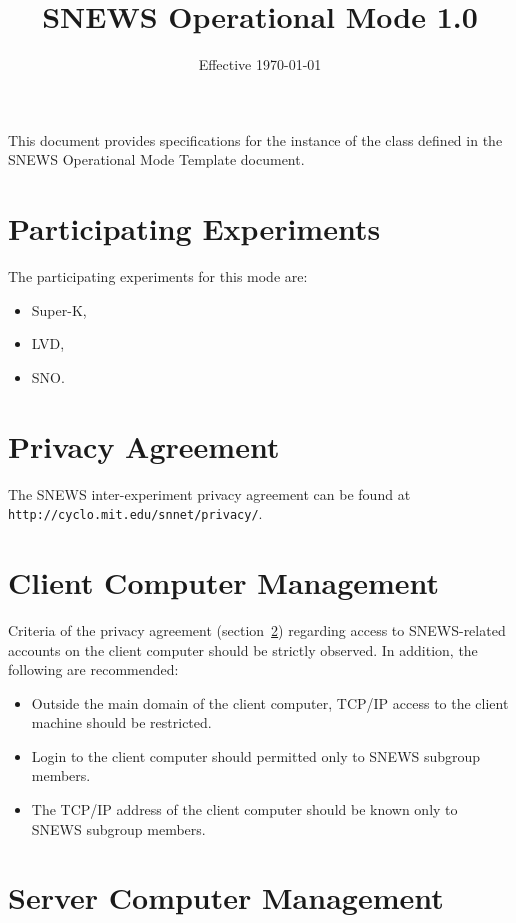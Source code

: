 \documentclass{article}
\begin{document}
\title{SNEWS Operational Mode 1.0}         
\date{Effective \today}
\maketitle

This document provides specifications for the instance of
the class defined in the SNEWS Operational Mode Template document.


\section{Participating Experiments}

The participating experiments for this mode are:

\begin{itemize}
\item Super-K,
\item LVD,
\item SNO.
\end{itemize}

\section{Privacy Agreement}\label{privacy}

The SNEWS inter-experiment privacy agreement can be found at \\
{\tt http://cyclo.mit.edu/snnet/privacy/}.

\section{Client Computer Management}

Criteria of the privacy agreement (section~\ref{privacy}) regarding
access to SNEWS-related accounts on the client computer should be
strictly observed. In addition, the following are recommended:

\begin{itemize}
\item Outside the main domain of the 
client computer, TCP/IP access to the client machine should be restricted.
\item Login to the client computer should permitted only to SNEWS subgroup 
members.
\item The TCP/IP address of the client computer should be known only to 
SNEWS subgroup members.
\end{itemize}

\section{Server Computer Management}
\end{document}
